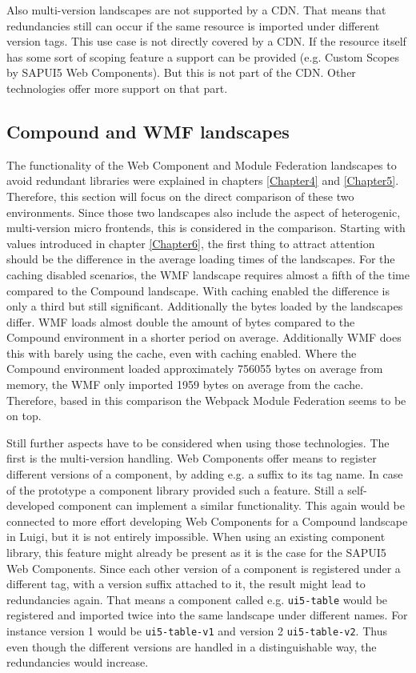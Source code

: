Also multi-version landscapes are not supported by a CDN. That means that redundancies still can occur if the same resource is imported under different version tags. This use case is not directly covered by a CDN. If the resource itself has some sort of scoping feature a support can be provided (e.g. Custom Scopes by SAPUI5 Web Components). But this is not part of the CDN. Other technologies offer more support on that part.

\subsection{Compound and WMF landscapes}

The functionality of the Web Component and Module Federation landscapes to avoid redundant libraries were explained in chapters \ref{Chapter4} and \ref{Chapter5}. Therefore, this section will focus on the direct comparison of these two environments. Since those two landscapes also include the aspect of heterogenic, multi-version micro frontends, this is considered in the comparison. 
Starting with values introduced in chapter \ref{Chapter6}, the first thing to attract attention should be the difference in the average loading times of the landscapes. For the caching disabled scenarios, the WMF landscape requires almost a fifth of the time compared to the Compound landscape. With caching enabled the difference is only a third but still significant. Additionally the bytes loaded by the landscapes differ. WMF loads almost double the amount of bytes compared to the Compound environment in a shorter period on average. Additionally WMF does this with barely using the cache, even with caching enabled. Where the Compound environment loaded approximately 756055 bytes on average from memory, the WMF only imported 1959 bytes on average from the cache. Therefore, based in this comparison the Webpack Module Federation seems to be on top.

Still further aspects have to be considered when using those technologies. The first is the multi-version handling. Web Components offer means to register different versions of a component, by adding e.g. a suffix to its tag name. In case of the prototype a component library provided such a feature. Still a self-developed component can implement a similar functionality. This again would be connected to more effort developing Web Components for a Compound landscape in Luigi, but it is not entirely impossible.
When using an existing component library, this feature might already be present as it is the case for the SAPUI5 Web Components. 
Since each other version of a component is registered under a different tag, with a version suffix attached to it, the result might lead to redundancies again. That means a component called e.g. \texttt{ui5-table} would be registered and imported twice into the same landscape under different names. For instance version 1 would be \texttt{ui5-table-v1} and version 2 \texttt{ui5-table-v2}. Thus even though the different versions are handled in a distinguishable way, the redundancies would increase.

